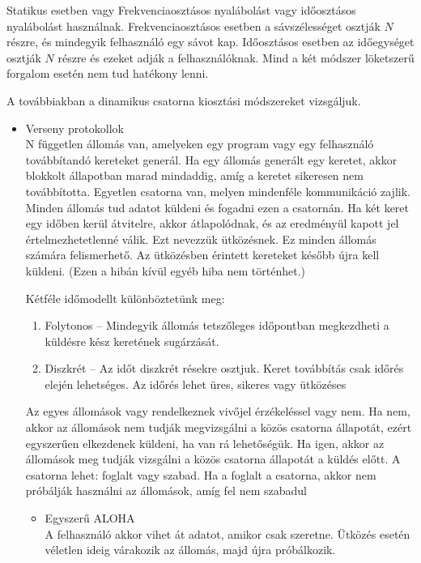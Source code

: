 \documentclass[margin=0px]{article}
\begin{document}
\begin{description}
\begin{description}
                Statikus esetben vagy Frekvenciaosztásos nyalábolást vagy időosztásos nyalábolást használnak. Frekvenciaosztásos esetben a sávszélességet osztják $N$ részre, és mindegyik felhasználó egy sávot kap. Időosztásos esetben az időegységet osztják $N$ részre és ezeket adják a felhasználóknak. Mind a két módszer löketszerű forgalom esetén nem tud hatékony lenni.

                A továbbiakban a dinamikus csatorna kiosztási módszereket vizsgáljuk.
                \begin{itemize}
                    \item Verseny protokollok \\
                          N független állomás van, amelyeken egy program vagy egy felhasználó továbbítandó kereteket generál. Ha egy állomás generált egy keretet, akkor blokkolt állapotban marad mindaddig, amíg a keretet sikeresen nem továbbította. Egyetlen csatorna van, melyen mindenféle kommunikáció zajlik. Minden állomás tud adatot küldeni és fogadni ezen a csatornán. Ha két keret egy időben kerül átvitelre, akkor átlapolódnak, és az eredményül kapott jel értelmezhetetlenné válik. Ezt nevezzük ütközésnek. Ez minden állomás számára felismerhető. Az ütközésben érintett kereteket később újra kell küldeni. (Ezen a hibán kívül egyéb hiba nem történhet.)

                          Kétféle időmodellt különböztetünk meg:
                          \begin{enumerate}
                              \item Folytonos – Mindegyik állomás tetszőleges időpontban megkezdheti a küldésre kész keretének sugárzását.
                              \item Diszkrét – Az időt diszkrét résekre osztjuk. Keret továbbítás csak időrés elején lehetséges. Az időrés lehet üres, sikeres vagy ütközéses
                          \end{enumerate}

                          Az egyes állomások vagy rendelkeznek vivőjel érzékeléssel vagy nem. Ha nem, akkor az állomások nem tudják megvizsgálni a közös csatorna állapotát, ezért egyszerűen elkezdenek küldeni, ha van rá lehetőségük. Ha igen, akkor az állomások meg tudják vizsgálni a közös csatorna állapotát a küldés előtt. A csatorna lehet: foglalt vagy szabad. Ha a foglalt a csatorna, akkor nem próbálják használni az állomások, amíg fel nem szabadul

                          \begin{itemize}
                              \item Egyszerű ALOHA \\
                                    A felhasználó akkor vihet át adatot, amikor csak szeretne. Ütközés esetén véletlen ideig várakozik az állomás, majd újra próbálkozik.


\end{itemize}
\end{itemize}
\end{description}
\end{description}
\end{document}
